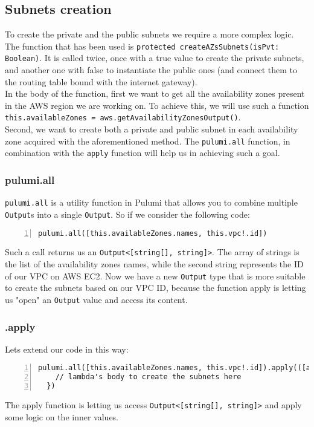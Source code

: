 \subsection{Subnets creation}
To create the private and the public subnets we require a more complex logic.
The function that has been used is \texttt{protected createAZsSubnets(isPvt: Boolean)}.
It is called twice, once with a true value to create the private subnets, and another one with false to instantiate the public ones (and connect them to the routing table bound with the internet gateway).\\
In the body of the function, first we want to get all the availability zones present in the AWS region we are working on.
To achieve this, we will use such a function \texttt{this.availableZones = aws.getAvailabilityZonesOutput()}.\\
Second, we want to create both a private and public subnet in each availability zone acquired with the aforementioned method.
The \texttt{pulumi.all} function, in combination with the \texttt{apply} function will help us in achieving such a goal.\\

\subsubsection{pulumi.all}
\label{sssec:pulumi-all}
\texttt{pulumi.all} is a utility function in Pulumi that allows you to combine multiple \texttt{Output}s into a single \texttt{Output}.
So if we consider the following code:\\
\begin{minipage}{\linewidth}
\begin{lstlisting}[numbers=left, numberstyle=\tiny, numbersep=-5pt, stepnumber=1]
  pulumi.all([this.availableZones.names, this.vpc!.id])
\end{lstlisting}
\end{minipage}
Such a call returns us an \texttt{Output<[string[], string]>}.
The array of strings is the list of the availability zones names, while the second string represents the ID of our VPC on AWS EC2.
Now we have a new \texttt{Output} type that is more suitable to create the subnets based on our VPC ID, because the function apply is letting us "open" an \texttt{Output} value and access its content.

\subsubsection{.apply}
Lets extend our code in this way:\\
\begin{minipage}{\linewidth}
\begin{lstlisting}[numbers=left, numberstyle=\tiny, numbersep=-5pt, stepnumber=1]
  pulumi.all([this.availableZones.names, this.vpc!.id]).apply(([azNames, vpcId]) => {
    // lambda's body to create the subnets here
  })
\end{lstlisting}
\end{minipage}
The apply function is letting us access \texttt{Output<[string[], string]>} and apply some logic on the inner values.\\

